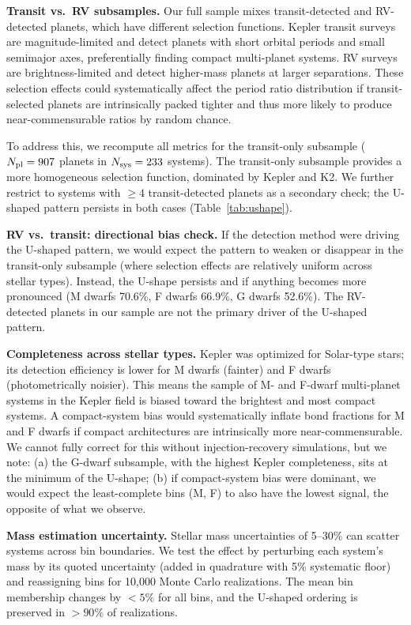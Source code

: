 \documentclass[twocolumn,usenatbib]{mnras}
\begin{document}
\textbf{Transit vs.\ RV subsamples.} Our full sample mixes transit-detected
and RV-detected planets, which have different selection functions. Kepler
transit surveys are magnitude-limited and detect planets with short orbital
periods and small semimajor axes, preferentially finding compact multi-planet
systems\citep{lissauer2011}. RV surveys are brightness-limited and detect
higher-mass planets at larger separations\citep{mayor2011}. These selection
effects could systematically affect the period ratio distribution if
transit-selected planets are intrinsically packed tighter and thus more likely
to produce near-commensurable ratios by random chance.

To address this, we recompute all metrics for the transit-only subsample
($N_{\rm pl} = 907$ planets in $N_{\rm sys} = 233$ systems). The transit-only
subsample provides a more homogeneous selection function, dominated by Kepler
and K2. We further restrict to systems with $\geq 4$ transit-detected planets
as a secondary check; the U-shaped pattern persists in both cases
(Table~\ref{tab:ushape}).

\textbf{RV vs.\ transit: directional bias check.} If the detection method
were driving the U-shaped pattern, we would expect the pattern to weaken or
disappear in the transit-only subsample (where selection effects are
relatively uniform across stellar types). Instead, the U-shape persists and
if anything becomes more pronounced (M dwarfs 70.6\%, F dwarfs 66.9\%, G
dwarfs 52.6\%). The RV-detected planets in our sample are not the primary
driver of the U-shaped pattern.

\textbf{Completeness across stellar types.} Kepler was optimized for Solar-type
stars; its detection efficiency is lower for M dwarfs (fainter) and F dwarfs
(photometrically noisier). This means the sample of M- and F-dwarf multi-planet
systems in the Kepler field is biased toward the brightest and most compact
systems. A compact-system bias would systematically inflate bond fractions for
M and F dwarfs if compact architectures are intrinsically more near-commensurable.
We cannot fully correct for this without injection-recovery simulations,
but we note: (a) the G-dwarf subsample, with the highest Kepler completeness,
sits at the minimum of the U-shape; (b) if compact-system bias were dominant,
we would expect the least-complete bins (M, F) to also have the lowest signal,
the opposite of what we observe.

\textbf{Mass estimation uncertainty.} Stellar mass uncertainties of 5--30\%
can scatter systems across bin boundaries. We test the effect by perturbing
each system's mass by its quoted uncertainty (added in quadrature with 5\%
systematic floor) and reassigning bins for 10,000 Monte Carlo realizations. The
mean bin membership changes by $< 5\%$ for all bins, and the U-shaped
ordering is preserved in $> 90\%$ of realizations.
\end{document}

